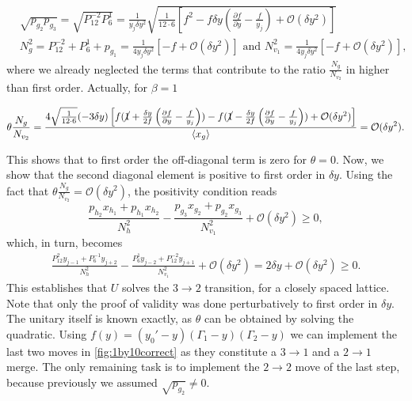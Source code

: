 \documentclass{article}
\begin{document}
\begin{align*}
   & \sqrt{p_{g_{2}}p_{g_{3}}}  =\sqrt{P_{12}^{-2}P_{6}^{1}}=\frac{1}{y_{j}\delta y^{2}}\sqrt{\frac{1}{12\cdot 6}\left[f^{2}-f\delta y\left(\frac{\partial f}{\partial y}-\frac{f}{y_{j}}\right)+\mathcal{O}(\delta y^{2})\right]} \\
   & N_{g}^{2}  =P_{12}^{-2}+P_{6}^{1}+p_{g_{1}} =\frac{1}{4y_{j}\delta y^{2}}\left[-f+\mathcal{O}(\delta y^{2})\right]\text{ and }
  N_{v_{1}}^{2}  =\frac{1}{4y_{j}\delta y^{2}}\left[-f+\mathcal{O}(\delta y^{2})\right],
\end{align*}where we already neglected the terms that contribute to the ratio $\frac{N_{g}}{N_{v_{2}}}$ in higher than first order.
Actually, for $\beta=1$
\begin{small}
  \begin{equation*}
    \theta\frac{N_{g}}{N_{v_{2}}}  =\frac{4\sqrt{\frac{1}{12\cdot 6}}(-3\delta y)\left[f (\cancel{1}+\frac{\delta y}{2f}\left(\frac{\partial f}{\partial y}-\frac{f}{y_{j}}\right))-f(\cancel{1}-\frac{\delta y}{2f}\left(\frac{\partial f}{\partial y}-\frac{f}{y_{j}}\right))+\mathcal{O}(\delta y^{2})\right]}{\langle x_{g}\rangle }=\mathcal{O}(\delta y^{2}).
  \end{equation*}
\end{small}This shows that to first order the off-diagonal term is zero for $\theta=0$. Now, we show that the second diagonal element is positive to first
order in $\delta y$. Using the fact that $\theta\frac{N_{g}}{N_{v_{2}}}=\mathcal{O}(\delta y^{2})$,
the positivity condition reads
\begin{displaymath}
  \frac{p_{h_{2}}x_{h_{1}}+p_{h_{1}}x_{h_{2}}}{N_{h}^{2}}-\frac{p_{g_{3}}x_{g_{2}}+p_{g_{2}}x_{g_{3}}}{N_{v_{1}}^{2}}+\mathcal{O}(\delta y^{2})\ge0,
\end{displaymath}
which, in turn, becomes
\begin{align*}
  \frac{P_{12}^{2}y_{j-1}+P_{6}^{-1}y_{j+2}}{N_{h}^{2}}-\frac{P_{6}^{1}y_{j-2}+P_{12}^{-2}y_{j+1}}{N_{v_{1}}^{2}}+\mathcal{O}(\delta y^{2})
  =2\delta y+\mathcal{O}(\delta y^{2})\ge0.
\end{align*}
This establishes that $U$ solves the $3\to 2$ transition, for a closely spaced lattice.
%
Note that only the proof of validity was done perturbatively to first
order in $\delta y$. The unitary itself is known exactly, as $\theta$
can be obtained by solving the quadratic. Using $f(y)=(y_{0}'-y)(\Gamma_{1}-y)(\Gamma_{2}-y)$ we can implement
the last two moves in  \cref{fig:1by10correct} as they constitute a $3\to1$
and a $2\to1$ merge. The only
remaining task is to implement the $2\to2$ move of the last step,
because previously we assumed $\sqrt{p_{g_{2}}}\neq0$.
\end{document}
